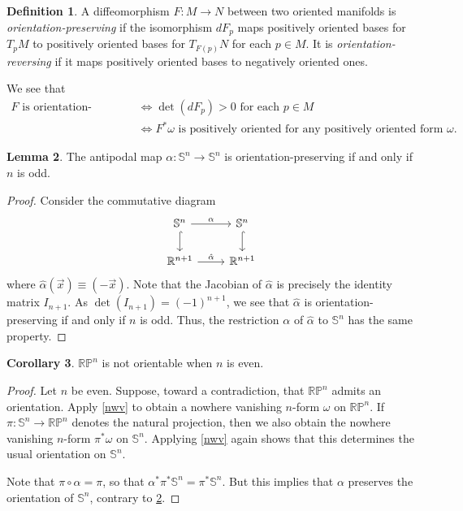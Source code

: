 \documentclass[10pt,letterpaper,cm]{nupset}
\theoremstyle{definition}
\newtheorem{definition}{Definition}[subsection]
\theoremstyle{theorem}
\newtheorem{lemma}[definition]{Lemma}
\newtheorem{corollary}[definition]{Corollary}
\theoremstyle{remark}
\newcommand{\R}{\mathbb R}
\newcommand{\RP}{\mathbb{RP}}
\renewcommand{\S}{\mathbb S}
\newcommand{\1}{\mathbf{1}}
\newcommand{\x}{\vec x}
\newcommand{\0}{\vec 0}
\begin{document}
\begin{definition}
A diffeomorphism $F: M \to N$ between two oriented manifolds is \textit{orientation-preserving} if the isomorphism $dF_p$ maps positively oriented bases for $T_pM$ to positively oriented bases for $T_{F(p)}N$ for each $p\in M$. It is \textit{orientation-reversing} if it maps positively oriented bases to negatively oriented ones.
\end{definition}

We see that 
\begin{align*}
F \text{ is orientation-preserving } & \iff \det(dF_p) >0 \text{ for each }p \in M
\\ &  \iff  F^{\ast}\omega \text{ is positively oriented for any positively oriented form }\omega.
\end{align*}

\begin{lemma}\label{antip}
The antipodal map $\alpha : \S^n \to \S^n$ is orientation-preserving  if and only if $n$ is odd.
\end{lemma}
\begin{proof}
Consider the commutative diagram
\[
\begin{tikzcd}
\S^n \arrow[r, "\alpha"] \arrow[d, hook] & \S^n \arrow[d, hook] \\
\R^{n+1} \arrow[r, "\hat{\alpha}"] & \R^{n+1}
\end{tikzcd}
\]
where $\hat{\alpha}(\x) \equiv ({-\x})$. Note that the Jacobian of $\hat{\alpha}$ is precisely the identity matrix $I_{n+1}$. As $\det(I_{n+1}) = ({-1})^{n+1}$, we see that $\hat{\alpha}$ is orientation-preserving  if and only if $n$ is odd. Thus, the restriction $\alpha$ of $\hat{\alpha}$ to $\S^n$ has the same property.
\end{proof}

\begin{corollary}\label{RPor}
$\RP^n$ is not orientable when $n$ is even. 
\end{corollary}
\begin{proof}
Let $n$ be even. Suppose, toward a contradiction, that $\RP^n$ admits an orientation. Apply \cref{nwv} to obtain a nowhere vanishing $n$-form $\omega$ on $\RP^n$. If $\pi : \S^n \to \RP^n$ denotes the natural projection, then we also obtain the nowhere vanishing $n$-form $\pi^{\ast}\omega$ on $\S^n$. Applying \cref{nwv} again shows that this determines the usual orientation on $\S^n$. 

Note that $\pi \circ \alpha = \pi$, so that $\alpha^{\ast} \pi^{\ast} \S^n = \pi^{\ast}\S^n$. But this implies that $\alpha$ preserves the orientation of $\S^n$, contrary to \cref{antip}.
\end{proof}
\end{document}
